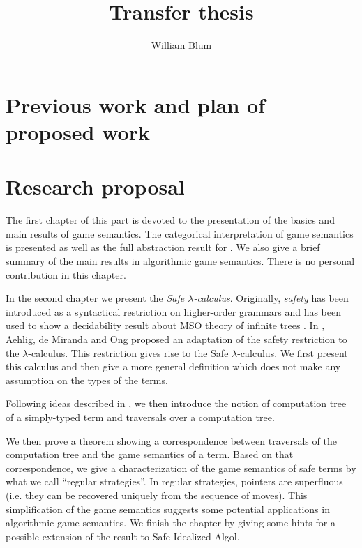 \documentclass[nocenter,sfbold]{thesis}
\author{William Blum}
\title{Transfer thesis}
\begin{document}
\maketitle \tableofcontents

\part{Previous work and plan of proposed work}




\part{Research proposal}

The first chapter of this part is devoted to the presentation of the
basics and main results of game semantics. The categorical
interpretation of game semantics is presented as well as the full
abstraction result for \pcf. We also give a brief summary of the
main results in algorithmic game semantics. There is no personal
contribution in this chapter.

In the second chapter we present the \emph{Safe $\lambda$-calculus}.
Originally, \emph{safety} has been introduced as a syntactical
restriction on higher-order grammars and has been used to show a
decidability result about MSO theory of infinite trees
\citep{KNU02}. In \cite{safety-mirlong2004}, Aehlig, de Miranda and
Ong  proposed an adaptation of the safety restriction to the
$\lambda$-calculus. This restriction gives rise to the Safe
$\lambda$-calculus. We first present this calculus and then give a
more general definition which does not make any assumption on the
types of the terms.

Following ideas described in \cite{OngLics2006}, we then introduce
the notion of computation tree of a simply-typed term and traversals
over a computation tree.

We then prove a theorem showing a correspondence between traversals
of the computation tree and the game semantics of a term. Based on
that correspondence, we give a characterization of the game
semantics of safe terms by what we call ``regular strategies''. In
regular strategies, pointers are superfluous (i.e. they can be
recovered uniquely from the sequence of moves). This simplification
of the game semantics suggests some potential applications in
algorithmic game semantics. We finish the chapter by giving some
hints for a possible extension of the result to Safe Idealized
Algol.
\end{document}
